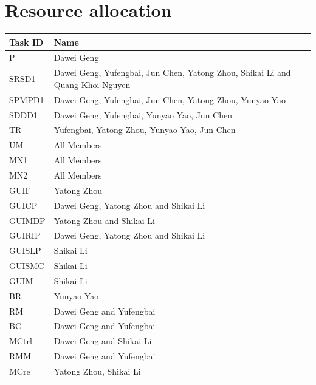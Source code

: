 \documentclass[11pt, a4paper]{report}
\begin{document}
\pagebreak
\section{Resource allocation}


\begin{center}
\begin{tabular}{| l | l |}
\hline
  Task ID 	& 			Name 																			\\ \hline
  P 		& 			Dawei Geng 																		\\ \hline
  SRSD1 	& 			Dawei Geng, Yufengbai, Jun Chen, Yatong Zhou, Shikai Li and Quang Khoi Nguyen 	\\ \hline
  SPMPD1 	& 			Dawei Geng, Yufengbai, Jun Chen, Yatong Zhou, Yunyao Yao 						\\ \hline
  SDDD1 	& 			Dawei Geng, Yufengbai, Yunyao Yao, Jun Chen 												\\ \hline
  TR 		&  			Yufengbai, Yatong Zhou, Yunyao Yao, Jun Chen 												\\ \hline
  UM  		& 			All Members  																	\\ \hline
  MN1 		& 			All Members 																	\\ \hline
  MN2 		& 			All Members 																	\\ \hline
  GUIF 		&  			Yatong Zhou                                                                     \\ \hline
  GUICP 	& 			Dawei Geng, Yatong Zhou and Shikai Li 											\\ \hline
  GUIMDP 	& 			Yatong Zhou and Shikai Li  														\\ \hline
  GUIRIP 	& 			Dawei Geng, Yatong Zhou and Shikai Li 											\\ \hline
  GUISLP 	& 			Shikai Li 																		\\ \hline
  GUISMC 	& 			Shikai Li 																		\\ \hline
  GUIM 		&  			Shikai Li 																		\\ \hline
  BR 		& 			Yunyao Yao 																		\\ \hline
  RM 		& 			Dawei Geng and Yufengbai 														\\ \hline
  BC 		& 			Dawei Geng and Yufengbai 														\\ \hline
  MCtrl 	& 			Dawei Geng and Shikai Li 														\\ \hline
  RMM 		& 			Dawei Geng and Yufengbai														\\ \hline
  MCre 		&  			Yatong Zhou, Shikai Li 															\\ \hline

\end{tabular}
\end{center}
\end{document}
